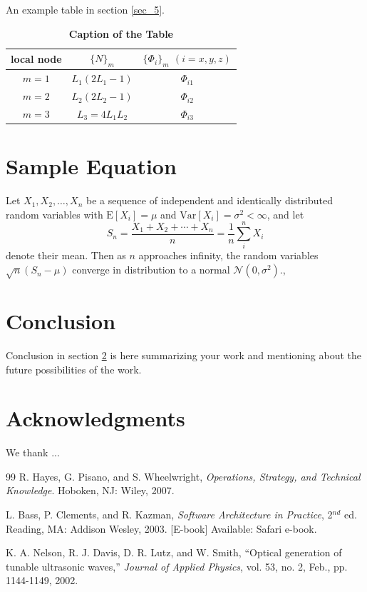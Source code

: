 \documentclass{mapana}
\begin{document}
An example table in section \ref{sec_5}.\cite{Hayes}

\begin{table}[htbp]
	\centering
	\caption{\bf Caption of the Table}
	\begin{tabular}{ccc}
		\hline
		local node & $\{N\}_m$ & $\{\Phi_i\}_m$ $(i=x,y,z)$ \\
		\hline
		$m = 1$ & $L_1(2L_1-1)$ & $\Phi_{i1}$ \\
		$m = 2$ & $L_2(2L_2-1)$ & $\Phi_{i2}$ \\
		$m = 3$ & $L_3=4L_1L_2$ & $\Phi_{i3}$ \\
		\hline
	\end{tabular}
	\label{tab:sample_table}
\end{table}

\section{Sample Equation}\label{sec_6}

Let $X_1, X_2, \ldots, X_n$ be a sequence of independent and identically distributed random variables with $\text{E}[X_i] = \mu$ and $\text{Var}[X_i] = \sigma^2 < \infty$, and let
\begin{equation}
S_n = \frac{X_1 + X_2 + \cdots + X_n}{n}
= \frac{1}{n}\sum_{i}^{n} X_i
\label{eq:refname1}
\end{equation}
denote their mean. Then as $n$ approaches infinity, the random variables $\sqrt{n}(S_n - \mu)$ converge in distribution to a normal $\mathcal{N}(0, \sigma^2)$.\cite{Nelson}, \cite{Bass}

\section{Conclusion}\label{coclusion}
Conclusion in section \ref{coclusion} is here summarizing your work and mentioning about the future possibilities of the work.
\section*{Acknowledgments}
We thank ...




\begin{thebibliography}{99}
	 R. Hayes, G. Pisano, and S. Wheelwright, \textit{Operations, Strategy, and Technical Knowledge}. Hoboken, NJ: Wiley, 2007.
	 
	 L. Bass, P. Clements, and R. Kazman, \textit{Software Architecture in Practice}, 2$^{nd}$ ed. Reading, MA: Addison Wesley, 2003. [E-book] Available: Safari e-book.

	
	 K. A. Nelson, R. J. Davis, D. R. Lutz, and W. Smith, ``Optical generation of tunable ultrasonic waves,'' \textit{Journal of Applied Physics}, vol. 53, no. 2, Feb., pp.
	1144-1149, 2002.
	
\end{thebibliography}
\end{document}
